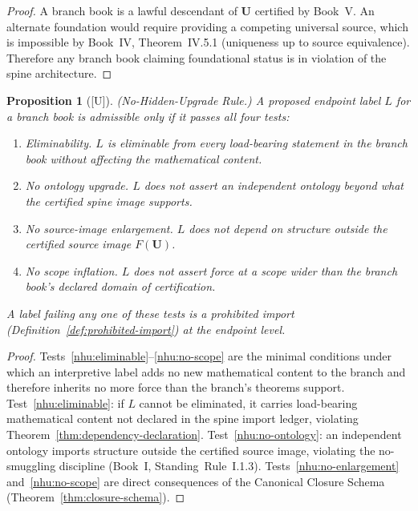 \documentclass[12pt,oneside]{amsbook}
\theoremstyle{plain}
\newtheorem{proposition}[theorem]{Proposition}
\theoremstyle{definition}
\theoremstyle{remark}
\newcommand{\status}[1]{\textup{[#1]}}
\begin{document}
\begin{proof}
A branch book is a lawful descendant of $\mathbf{U}$ certified by
Book~V.  An alternate foundation would require providing a competing
universal source, which is impossible by Book~IV,
Theorem~IV.5.1 (uniqueness up to source equivalence).  Therefore any
branch book claiming foundational status is in violation of the spine
architecture.
\end{proof}


\begin{proposition}[\status{U}]\label{prop:no-hidden-upgrade}
\textup{(No-Hidden-Upgrade Rule.)}  A proposed endpoint label $L$ for
a branch book is admissible only if it passes all four tests:
\begin{enumerate}[label=\textup{(\roman*)}]
  \item\label{nhu:eliminable} \emph{Eliminability.}  $L$ is
        eliminable from every load-bearing statement in the branch
        book without affecting the mathematical content.
  \item\label{nhu:no-ontology} \emph{No ontology upgrade.}  $L$ does
        not assert an independent ontology beyond what the certified
        spine image supports.
  \item\label{nhu:no-enlargement} \emph{No source-image enlargement.}
        $L$ does not depend on structure outside the certified
        source image $F(\mathbf{U})$.
  \item\label{nhu:no-scope} \emph{No scope inflation.}  $L$ does not
        assert force at a scope wider than the branch book's declared
        domain of certification.
\end{enumerate}
A label failing any one of these tests is a prohibited import
(Definition~\ref{def:prohibited-import}) at the endpoint level.
\end{proposition}

\begin{proof}
Tests~\ref{nhu:eliminable}--\ref{nhu:no-scope} are the minimal
conditions under which an interpretive label adds no new mathematical
content to the branch and therefore inherits no more force than the
branch's theorems support.  Test~\ref{nhu:eliminable}: if $L$ cannot
be eliminated, it carries load-bearing mathematical content not
declared in the spine import ledger, violating
Theorem~\ref{thm:dependency-declaration}.
Test~\ref{nhu:no-ontology}: an independent ontology imports
structure outside the certified source image, violating the
no-smuggling discipline (Book~I, Standing~Rule~I.1.3).
Tests~\ref{nhu:no-enlargement} and~\ref{nhu:no-scope} are direct
consequences of the Canonical Closure Schema
(Theorem~\ref{thm:closure-schema}).
\end{proof}
\end{document}

